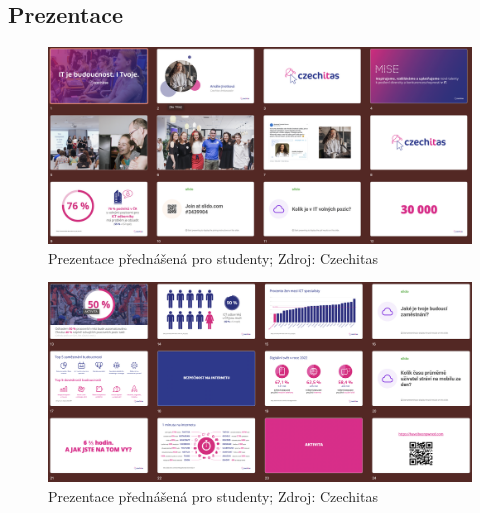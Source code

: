 \documentclass[12pt]{report}			%
\begin{document}
	\nocite{*}
    \printbibliography					%
    \listoffigures						%
    \begin{appendices}
	\chapter{Prezentace}
	    
	    \begin{figure}[h]
            \centering
            \includegraphics[width=16cm]{Maturitni Prace/images/Screenshot 2023-01-29 at 19.09.06.png} 
            \caption{Prezentace přednášená pro studenty; Zdroj: Czechitas}
            \label{fig:prezentace_1}
        \end{figure} 
        
        \begin{figure}[h]
            \centering
            \includegraphics[width=16cm]{Maturitni Prace/images/Screenshot 2023-01-29 at 19.09.25.png} 
            \caption{Prezentace přednášená pro studenty; Zdroj: Czechitas}
            \label{fig:prezentace_2}
        \end{figure} 
        

\end{appendices}
\end{document}
